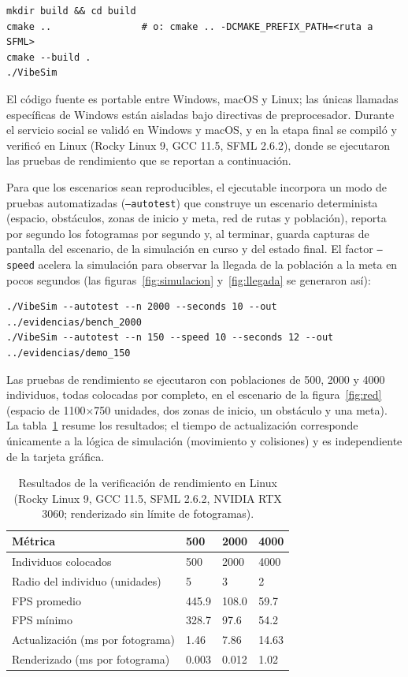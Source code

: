 \documentclass[12pt,a4paper]{article}
\begin{document}
\begin{verbatim}
mkdir build && cd build
cmake ..                # o: cmake .. -DCMAKE_PREFIX_PATH=<ruta a SFML>
cmake --build .
./VibeSim
\end{verbatim}

El código fuente es portable entre Windows, macOS y Linux; las únicas llamadas específicas de Windows están aisladas bajo directivas de preprocesador. Durante el servicio social se validó en Windows y macOS, y en la etapa final se compiló y verificó en Linux (Rocky Linux 9, GCC 11.5, SFML 2.6.2), donde se ejecutaron las pruebas de rendimiento que se reportan a continuación.

Para que los escenarios sean reproducibles, el ejecutable incorpora un modo de pruebas automatizadas (\texttt{--autotest}) que construye un escenario determinista (espacio, obstáculos, zonas de inicio y meta, red de rutas y población), reporta por segundo los fotogramas por segundo y, al terminar, guarda capturas de pantalla del escenario, de la simulación en curso y del estado final. El factor \texttt{--speed} acelera la simulación para observar la llegada de la población a la meta en pocos segundos (las figuras~\ref{fig:simulacion} y~\ref{fig:llegada} se generaron así):

\begin{verbatim}
./VibeSim --autotest --n 2000 --seconds 10 --out ../evidencias/bench_2000
./VibeSim --autotest --n 150 --speed 10 --seconds 12 --out ../evidencias/demo_150
\end{verbatim}

Las pruebas de rendimiento se ejecutaron con poblaciones de 500, 2000 y 4000 individuos, todas colocadas por completo, en el escenario de la figura~\ref{fig:red} (espacio de 1100$\times$750 unidades, dos zonas de inicio, un obstáculo y una meta). La tabla~\ref{tab:rendimiento} resume los resultados; el tiempo de actualización corresponde únicamente a la lógica de simulación (movimiento y colisiones) y es independiente de la tarjeta gráfica.

\begin{table}[H]
    \centering
    \caption{Resultados de la verificación de rendimiento en Linux (Rocky Linux 9, GCC 11.5, SFML 2.6.2, NVIDIA RTX 3060; renderizado sin límite de fotogramas).}
    \label{tab:rendimiento}
    \begin{tabularx}{\textwidth}{p{5.5cm} X X X}
        \toprule
        \textbf{Métrica} & \textbf{500} & \textbf{2000} & \textbf{4000} \\
        \midrule
        Individuos colocados & 500 & 2000 & 4000 \\
        Radio del individuo (unidades) & 5 & 3 & 2 \\
        FPS promedio & 445.9 & 108.0 & 59.7 \\
        FPS mínimo & 328.7 & 97.6 & 54.2 \\
        Actualización (ms por fotograma) & 1.46 & 7.86 & 14.63 \\
        Renderizado (ms por fotograma) & 0.003 & 0.012 & 1.02 \\
        \bottomrule
    \end{tabularx}
\end{table}
\end{document}
